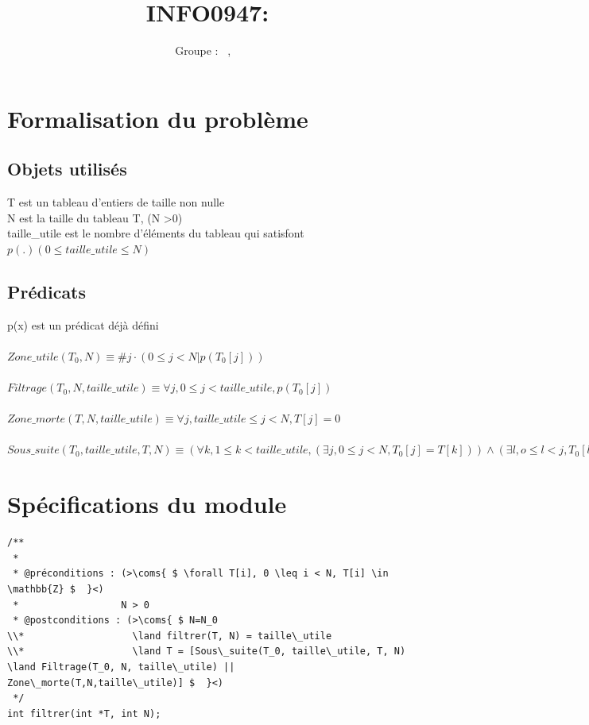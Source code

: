 \documentclass[a4paper, 11pt, oneside]{article}
\title{INFO0947: \intitule}
\author{Groupe \GrNbr : \PrenomUN~\textsc{\NomUN}, \PrenomDEUX~\textsc{\NomDEUX}}
\date{}
\newcommand{\coms}[1]{\textcolor{MidnightBlue}{#1}}
\newcommand{\tablemat}{~}
\renewcommand{\tablemat}{\tableofcontents}
\begin{document}
\maketitle
\newpage
\tablemat
\newpage


\section{Formalisation du problème}
\subsection{Objets utilisés}

T est un tableau d'entiers de taille non nulle
\\
N est la taille du tableau T,  (N \textgreater 0)
\\
taille\_utile est le nombre d'éléments du tableau qui satisfont $p(.) (0 \leq taille\_utile \leq N  )$

\subsection{Prédicats}
p(x) est un prédicat déjà défini 
\\
\\
$Zone\_utile(T_{0},  N)  \equiv \#j \cdot (0\leq j < N|  p(T_{0}[j]))  $
\\
\\
$Filtrage(T_{0}, N,taille\_utile)\equiv \forall j, 0 \leq j < taille\_utile, p(T_{0}[j])$\\
\\
$Zone\_morte(T, N,taille\_utile)\equiv \forall j, taille\_utile \leq j < N, T[j] = 0$ 
\\
\\
$Sous\_suite(T_0, taille\_utile, T, N)\equiv (\forall k, 1 \leq k < taille\_utile, (\exists j, 0 \leq j<N, T_0[j]=T[k]))\land(\exists l, o \leq l < j, T_0[l]=T[k-1]) $


\section{Spécifications du module}


\begin{lstlisting}
/**
 *
 * @préconditions : (>\coms{ $ \forall T[i], 0 \leq i < N, T[i] \in \mathbb{Z} $  }<)
 *                  N > 0
 * @postconditions : (>\coms{ $ N=N_0
\\*                   \land filtrer(T, N) = taille\_utile
\\*                   \land T = [Sous\_suite(T_0, taille\_utile, T, N) \land Filtrage(T_0, N, taille\_utile) || Zone\_morte(T,N,taille\_utile)] $  }<)
 */
int filtrer(int *T, int N);

\end{lstlisting}
\end{document}
